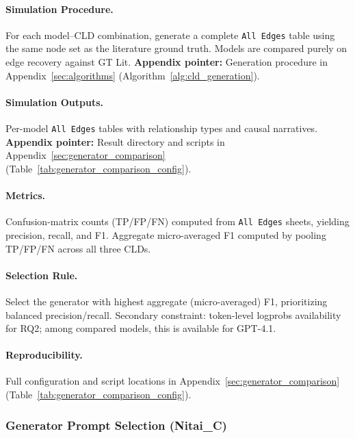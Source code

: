 \paragraph{Simulation Procedure.}
For each model--CLD combination, generate a complete \texttt{All Edges} table using the same node set as the literature ground truth. Models are compared purely on edge recovery against GT Lit.
\textbf{Appendix pointer:} Generation procedure in Appendix~\ref{sec:algorithms} (Algorithm~\ref{alg:cld_generation}).

\paragraph{Simulation Outputs.}
Per-model \texttt{All Edges} tables with relationship types and causal narratives.
\textbf{Appendix pointer:} Result directory and scripts in Appendix~\ref{sec:generator_comparison} (Table~\ref{tab:generator_comparison_config}).

\paragraph{Metrics.}
Confusion-matrix counts (TP/FP/FN) computed from \texttt{All Edges} sheets, yielding precision, recall, and F1. Aggregate micro-averaged F1 computed by pooling TP/FP/FN across all three CLDs.

\paragraph{Selection Rule.}
Select the generator with highest aggregate (micro-averaged) F1, prioritizing balanced precision/recall. Secondary constraint: token-level logprobs availability for RQ2; among compared models, this is available for GPT-4.1.

\paragraph{Reproducibility.}
Full configuration and script locations in Appendix~\ref{sec:generator_comparison} (Table~\ref{tab:generator_comparison_config}).

\subsubsection{Generator Prompt Selection (Nitai\_C)}

